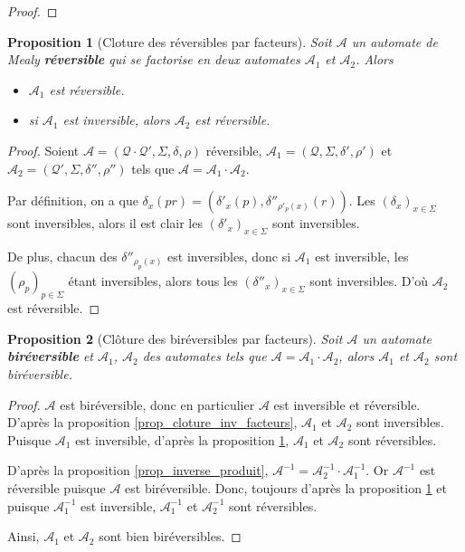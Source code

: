 \documentclass{article}
\newtheorem{prop}{Proposition}
\begin{document}
\begin{proof}
	
\end{proof}

\begin{prop}[Cloture des réversibles par facteurs]\label{prop_cloture_rev_facteurs}
  Soit $\mathcal{A}$ un automate de Mealy \textbf{réversible} qui se factorise en deux automates $\mathcal{A}_1$ et $\mathcal{A}_2$. Alors
  \begin{itemize}
  \item $\mathcal{A}_1$ est réversible.
  \item si $\mathcal{A}_1$ est inversible, alors $\mathcal{A}_2$ est réversible.
  \end{itemize}
\end{prop}

\begin{proof}
  Soient $\mathcal{A}=\left(\mathcal{Q\cdot Q'}, \Sigma, \delta, \rho\right)$ réversible, $\mathcal{A}_1=\left(\mathcal{Q}, \Sigma, \delta', \rho'\right)$ et $\mathcal{A}_2=\left(\mathcal{Q'}, \Sigma, \delta'', \rho''\right)$ tels que $\mathcal{A} = \mathcal{A}_1\cdot\mathcal{A}_2$.

  Par définition, on a que $\delta_x(pr) = (\delta'_x(p), \delta''_{\rho'_p(x)}(r))$. Les ${(\delta_x)}_{x\in\Sigma}$ sont inversibles, alors il est clair les ${(\delta'_x)}_{x\in\Sigma}$ sont inversibles.

  De plus, chacun des $\delta''_{\rho_p(x)}$ est inversibles, donc si $\mathcal{A}_1$ est inversible, les ${(\rho_p)}_{p\in\Sigma}$ étant inversibles, alors tous les ${(\delta''_x)}_{x\in\Sigma}$ sont inversibles. D'où $\mathcal{A}_2$ est réversible.
\end{proof}

\begin{prop}[Clôture des biréversibles par facteurs]
  Soit $\mathcal{A}$ un automate \textbf{biréversible} et $\mathcal{A}_1$, $\mathcal{A}_2$ des automates tels que $\mathcal{A}=\mathcal{A}_1\cdot\mathcal{A}_2$, alors $\mathcal{A}_1$ et $\mathcal{A}_2$ sont biréversible.
\end{prop}

\begin{proof}
	$\mathcal{A}$ est biréversible, donc en particulier $\mathcal{A}$ est inversible et réversible. D'après la proposition \ref{prop_cloture_inv_facteurs}, $\mathcal{A}_1$ et $\mathcal{A}_2$ sont inversibles. Puisque $\mathcal{A}_1$ est inversible, d'après la proposition \ref{prop_cloture_rev_facteurs}, $\mathcal{A}_1$ et $\mathcal{A}_2$ sont réversibles.
	
	D'après la proposition \ref{prop_inverse_produit}, $\mathcal{A}^{-1} = \mathcal{A}_2^{-1} \cdot \mathcal{A}_1^{-1}$. Or $\mathcal{A}^{-1}$ est réversible puisque $\mathcal{A}$ est biréversible. Donc, toujours d'après la proposition \ref{prop_cloture_rev_facteurs} et puisque $\mathcal{A}_1^{-1}$ est inversible, $\mathcal{A}_1^{-1}$ et $\mathcal{A}_2^{-1}$ sont réversibles.
	
	Ainsi, $\mathcal{A}_1$ et $\mathcal{A}_2$ sont bien biréversibles.
\end{proof}
\end{document}
